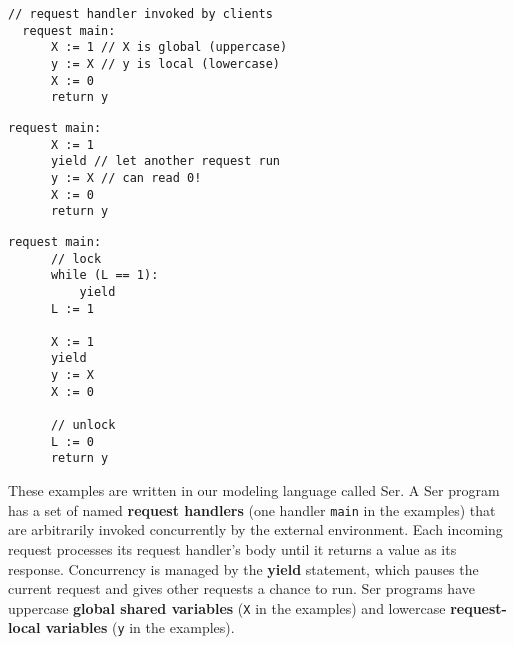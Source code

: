 \noindent
\begin{minipage}[t]{0.55\textwidth}
	\begin{minipage}[t]{\textwidth}
		\begin{lstlisting}[caption={Without yield or lock (serializable)},
			label={lst:MotivatingExample1Ser}]
  // request handler invoked by clients          
  request main: 
      X := 1 // X is global (uppercase)
      y := X // y is local (lowercase)
      X := 0
      return y 
		\end{lstlisting}
	\end{minipage}
	\vspace{1em}
	\begin{minipage}[t]{\textwidth}
		\begin{lstlisting}[caption={With yield (not serializable)},
			label={lst:MotivatingExample2NonSer}]
  request main: 
      X := 1 
      yield // let another request run
      y := X // can read 0!
      X := 0
      return y 	
		\end{lstlisting}
	\end{minipage}
\end{minipage}%
\hfill
\begin{minipage}[t]{0.35\textwidth}
	\begin{lstlisting}[caption={With yield and lock (serializable)},
		label={lst:MotivatingExample3Ser}]
  request main: 
      // lock
      while (L == 1): 
          yield
      L := 1 

      X := 1
      yield
      y := X 
      X := 0

      // unlock    
      L := 0
      return y 
	\end{lstlisting}
\end{minipage}

These examples are written in our modeling language called Ser.
A Ser program has a set of named \textbf{request handlers} (one handler \texttt{main} in the examples) that are arbitrarily invoked concurrently by the external environment.
Each incoming request processes its request handler's body until it returns a value as its response. Concurrency is managed by the \textbf{yield} statement, which pauses the current request and gives other requests a chance to run. Ser programs have uppercase \textbf{global shared variables} (\texttt{X} in the examples) and lowercase \textbf{request-local variables} (\texttt{y} in the examples).



